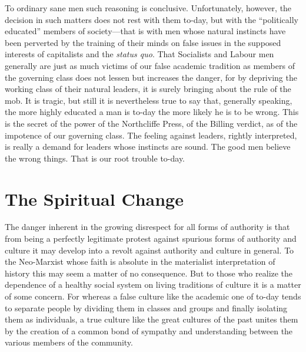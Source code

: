 \documentclass{book}
\begin{document}
To ordinary sane men such reasoning is conclusive. Unfortunately, however, the decision in such matters does not rest with them to-day, but with the “politically educated” members of society—that is with men whose natural instincts have been perverted by the training of their minds on false issues in the supposed interests of capitalists and the \emph{status quo}. That Socialists and Labour men generally are just as much victims of our false academic tradition as members of the governing class does not lessen but increases the danger, for by depriving the working class of their natural leaders, it is surely bringing about the rule of the mob. It is tragic, but still it is nevertheless true to say that, generally speaking, the more highly educated a man is to-day the more likely he is to be wrong. This is the secret of the power of the Northcliffe Press, of the Billing verdict, as of the impotence of our governing class. The feeling against leaders, rightly interpreted, is really a demand for leaders whose instincts are sound. The good men believe the wrong things. That is our root trouble to-day.

\chapter{The Spiritual Change}
\label{chapter-4}
The danger inherent in the growing disrespect for all forms of authority is that from being a perfectly legitimate protest against spurious forms of authority and culture it may develop into a revolt against authority and culture in general. To the Neo-Marxist whose faith is absolute in the materialist interpretation of history this may seem a matter of no consequence. But to those who realize the dependence of a healthy social system on living traditions of culture it is a matter of some concern. For whereas a false culture like the academic one of to-day tends to separate people by dividing them in classes and groups and finally isolating them as individuals, a true culture like the great cultures of the past unites them by the creation of a common bond of sympathy and understanding between the various members of the community.
\end{document}
